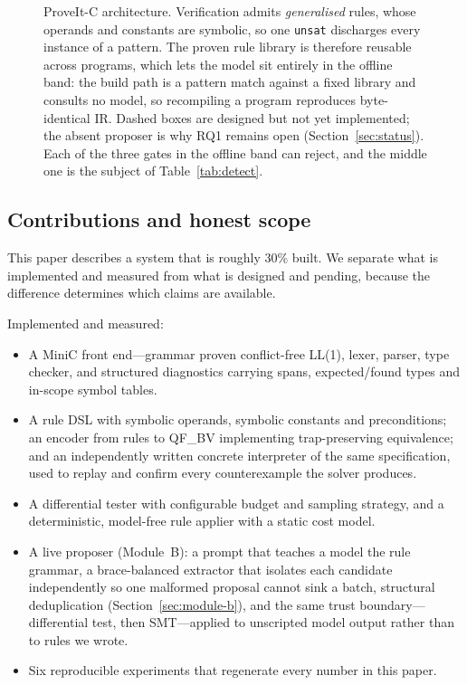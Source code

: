 \documentclass[conference]{IEEEtran}
\begin{document}
\begin{figure}[!t]
{\begin{tikzpicture}
\end{tikzpicture}}
\caption{ProveIt-C architecture. Verification admits \emph{generalised} rules,
whose operands and constants are symbolic, so one \texttt{unsat} discharges
every instance of a pattern. The proven rule library is therefore reusable
across programs, which lets the model sit entirely in the offline band: the
build path is a pattern match against a fixed library and consults no model,
so recompiling a program reproduces byte-identical IR. Dashed boxes are
designed but not yet implemented; the absent proposer is why RQ1 remains open
(Section~\ref{sec:status}). Each of the three gates in the offline band can
reject, and the middle one is the subject of Table~\ref{tab:detect}.}
\label{fig:arch}
\end{figure}

\subsection{Contributions and honest scope}

This paper describes a system that is roughly 30\% built. We separate what is
implemented and measured from what is designed and pending, because the
difference determines which claims are available.

Implemented and measured:
\begin{itemize}
\item A MiniC front end---grammar proven conflict-free LL(1), lexer, parser,
type checker, and structured diagnostics carrying spans, expected/found types
and in-scope symbol tables.
\item A rule DSL with symbolic operands, symbolic constants and preconditions;
an encoder from rules to QF\_BV implementing trap-preserving equivalence; and
an independently written concrete interpreter of the same specification, used
to replay and confirm every counterexample the solver produces.
\item A differential tester with configurable budget and sampling strategy, and
a deterministic, model-free rule applier with a static cost model.
\item A live proposer (Module~B): a prompt that teaches a model the rule
grammar, a brace-balanced extractor that isolates each candidate independently
so one malformed proposal cannot sink a batch, structural deduplication
(Section~\ref{sec:module-b}), and the same trust boundary---differential test,
then SMT---applied to unscripted model output rather than to rules we wrote.
\item Six reproducible experiments that regenerate every number in this paper.
\end{itemize}
\end{document}
